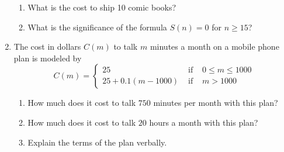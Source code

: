\begin{enumerate}
\begin{enumerate}

\item  What is the cost to ship 10 comic books?  

\item  What is the significance of the formula $S(n) = 0$ for $n \geq 15$?   
 
\end{enumerate}

\newpage

\item  \label{piecewisemobile} The cost in dollars $C(m)$  to talk $m$ minutes a month on a mobile phone plan is modeled by   \[{\displaystyle C(m) = \left\{ \begin{array}{rcl} 25 & \mbox{ if } & 0 \leq m \leq 1000 \\
                                                            25+0.1(m-1000) & \mbox{ if } & m > 1000
                                     \end{array} \right. }\]
                                     
\begin{enumerate}

\item  How much does it cost to talk $750$ minutes per month with this plan?  

\item  How much does it cost to talk $20$ hours a month with this plan?  

\item  Explain the terms of the plan verbally.  
\end{enumerate}


\setcounter{HW}{\value{enumi}}
\end{enumerate}


